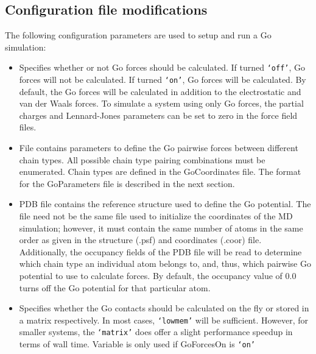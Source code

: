 \subsection{Configuration file modifications} 

The following configuration parameters are used to setup and run a Go simulation:

\begin{itemize}

\item
{}
{Specifies whether or not Go forces should be calculated.  If turned {\tt `off'}, 
Go forces will not be calculated.  If turned {\tt `on'}, Go forces will be calculated.  By default,
the Go forces will be calculated in addition to the electrostatic and van der Waals forces.  
To simulate a system using only Go forces, the partial charges and Lennard-Jones parameters can be set to zero in the force field files.}

\item
{}
{File contains parameters to define the Go pairwise forces between different chain types.
All possible chain type pairing combinations must be enumerated.
Chain types are defined in the GoCoordinates file.
The format for the GoParameters file is described in the next section.}

\item
{}
{PDB file contains the reference structure used to define the Go potential.  
The file need not be the same file used to initialize the coordinates of the MD simulation; however,
it must contain the same number of atoms in the same order as given in the structure (.psf) and coordinates (.coor) file.
Additionally, the occupancy fields of the PDB file will be read to determine which chain type an individual atom belongs to, and, thus,
which pairwise Go potential to use to calculate forces.  By default, the occupancy value of 0.0 turns off the Go potential
for that particular atom.
}

\item
{}
{Specifies whether the Go contacts should be calculated on the fly or stored in a matrix respectively.
In most cases, {\tt `lowmem'} will be sufficient.  However, for smaller systems, the {\tt `matrix'}
does offer a slight performance speedup  in terms of wall time.
  Variable is only used if GoForcesOn is {\tt `on'}}

\end{itemize}


